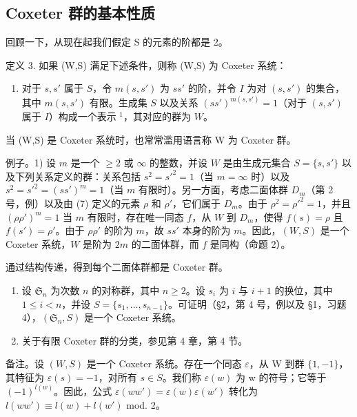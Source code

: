 \subsection{Coxeter 群的基本性质}

回顾一下，从现在起我们假定 S 的元素的阶都是 2。

定义 3. 如果 (W,S) 满足下述条件，则称 (W,S) 为 Coxeter 系统：

\begin{enumerate}
\def\labelenumi{(\Alph{enumi})}
\setcounter{enumi}{2}
\tightlist
\item
  对于 \(s, s'\) 属于 \(S\)，令 \(m(s, s')\) 为 \(ss'\) 的阶，并令 \(I\) 为对 \((s, s')\) 的集合，其中 \(m(s, s')\) 有限。生成集 \(S\) 以及关系 \((ss')^{m(s, s')} = 1\)（对于 \((s, s')\) 属于 \(I\)）构成一个表示 \(^{1}\)，其对应的群为 \(W\)。
\end{enumerate}

当 (W,S) 是 Coxeter 系统时，也常常滥用语言称 W 为 Coxeter 群。

例子。1) 设 \(m\) 是一个 \(\geqslant 2\) 或 \(\infty\) 的整数，并设 \(W\) 是由生成元集合 \(S = \{s, s'\}\) 以及下列关系定义的群：关系包括 \(s^2 = s'^2 = 1\)（当 \(m = \infty\) 时）以及 \(s^2 = s'^2 = (ss')^m = 1\)（当 \(m\) 有限时）。另一方面，考虑二面体群 \(D_m\)（第 2 号，例）以及由 (7) 定义的元素 \(\rho\) 和 \(\rho'\)，它们属于 \(D_m\)。由于 \(\rho^2 = \rho'^2 = 1\)，并且 \((\rho \rho')^m = 1\) 当 \(m\) 有限时，存在唯一同态 \(f\)，从 \(W\) 到 \(D_m\)，使得 \(f(s) = \rho\) 且 \(f(s') = \rho'\)。由于 \(\rho \rho'\) 的阶为 \(m\)，故 \(ss'\) 本身的阶为 \(m\)。因此，\((W, S)\) 是一个 Coxeter 系统，\(W\) 是阶为 \(2m\) 的二面体群，而 \(f\) 是同构（命题 2）。

通过结构传递，得到每个二面体群都是 Coxeter 群。

\begin{enumerate}
\def\labelenumi{\arabic{enumi})}
\setcounter{enumi}{1}
\item
  设 \(\mathfrak{S}_n\) 为次数 \(n\) 的对称群，其中 \(n \geqslant 2\)。设 \(s_i\) 为 \(i\) 与 \(i + 1\) 的换位，其中 \(1 \leqslant i < n\)，并设 \(S = \{s_1, \ldots, s_{n-1}\}\)。可证明（§2，第 4 号，例以及 §1，习题 4），\((\mathfrak{S}_n, S)\) 是一个 Coxeter 系统。
\item
  关于有限 Coxeter 群的分类，参见第 4 章，第 4 节。
\end{enumerate}

备注。设 \((W,S)\) 是一个 Coxeter 系统。存在一个同态 \(\varepsilon\)，从 W 到群 \(\{1,-1\}\)，其特征为 \(\varepsilon(s)=-1\)，对所有 \(s\in S\)。我们称 \(\varepsilon(w)\) 为 w 的符号；它等于 \((-1)^{l(w)}\)。因此，公式 \(\varepsilon(ww')=\varepsilon(w)\varepsilon(w')\) 转化为 \(l(ww')\equiv l(w)+l(w')\) mod. 2。

